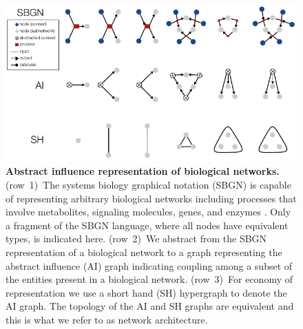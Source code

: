 \begin{figure}[!ht]
\centering
\noindent\includegraphics[width=0.9\columnwidth]{fig/netsubnetcontext.pdf}
\caption{{\bf Abstract influence representation of biological networks.} (row~1)~The systems biology graphical notation (SBGN) is capable of representing arbitrary biological networks including processes that involve metabolites, signaling molecules, genes, and enzymes \cite{LeNovere2009}. Only a fragment of the SBGN language, where all nodes have equivalent types, is indicated here. (row~2)~We abstract from the SBGN representation of a biological network to a graph representing the abstract influence (AI) graph indicating coupling among a subset of the entities present in a biological network. (row~3)~For economy of representation we use a short hand (SH) hypergraph to denote the AI graph. The topology of the AI and SH graphs are equivalent and this is what we refer to as network architecture.}
\label{fig:netsubnetcontext}
\end{figure}

